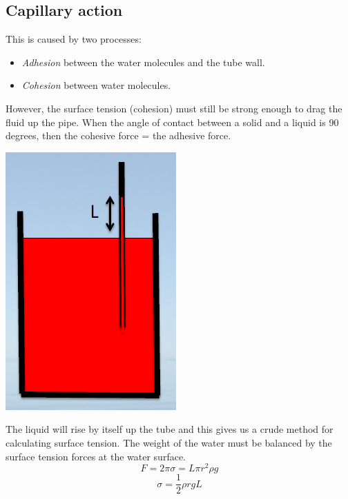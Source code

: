 \documentclass[class=report, crop=false, 12pt,a4paper]{standalone}
\begin{document}
\subsection{Capillary action}
This is caused by two processes:
\begin{itemize}[noitemsep]
  \item \emph{Adhesion} between the water molecules and the tube wall.
  \item \emph{Cohesion} between water molecules.
\end{itemize}
However, the surface tension (cohesion) must still be strong enough to drag the fluid up the pipe. When the angle of contact between a solid and a liquid is 90 degrees, then the cohesive force = the adhesive force.
\begin{center}
  \includegraphics[width = 0.4 \textwidth]{../img/CapillaryAction}
\end{center}
The liquid will rise by itself up the tube and this gives us a crude method for calculating surface tension. The weight of the water must be balanced by the surface tension forces at the water surface.
\begin{equation}
  F = 2\pi \sigma = L\pi r^2 \rho g
\end{equation}
\begin{equation}
  \sigma = \frac{1}{2}\rho r g L
\end{equation}
\end{document}
